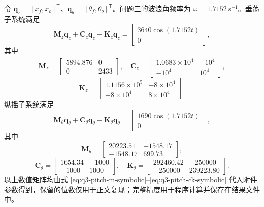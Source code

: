 \documentclass[withoutpreface]{../../../templates/CUMCM2026-Complete-LaTeX/cumcmthesis}
\begin{document}
令 $\boldsymbol q_z=[x_f,x_o]^{\mathsf T}$、$\boldsymbol q_\theta=[\theta_f,\theta_o]^{\mathsf T}$。问题三的波浪角频率为 $\omega=1.7152\ \mathrm{s^{-1}}$。垂荡子系统满足
\begin{equation}
  \boldsymbol M_z\ddot{\boldsymbol q}_z+
  \boldsymbol C_z\dot{\boldsymbol q}_z+
  \boldsymbol K_z\boldsymbol q_z=
  \begin{bmatrix}3640\cos(1.7152t)\\0\end{bmatrix},
  \label{eq:q3-heave-system}
\end{equation}
其中
\begin{equation}
  \boldsymbol M_z=\begin{bmatrix}5894.876&0\\0&2433\end{bmatrix},\quad
  \boldsymbol C_z=\begin{bmatrix}1.0683\times10^4&-10^4\\-10^4&10^4\end{bmatrix},
  \label{eq:q3-heave-mc}
\end{equation}
\begin{equation}
  \boldsymbol K_z=\begin{bmatrix}1.1156\times10^5&-8\times10^4\\-8\times10^4&8\times10^4\end{bmatrix}.
  \label{eq:q3-heave-k}
\end{equation}
纵摇子系统满足
\begin{equation}
  \boldsymbol M_\theta\ddot{\boldsymbol q}_\theta+
  \boldsymbol C_\theta\dot{\boldsymbol q}_\theta+
  \boldsymbol K_\theta\boldsymbol q_\theta=
  \begin{bmatrix}1690\cos(1.7152t)\\0\end{bmatrix},
  \label{eq:q3-pitch-system}
\end{equation}
其中
\begin{equation}
  \boldsymbol M_\theta=
  \begin{bmatrix}20223.51&-1548.17\\-1548.17&699.73\end{bmatrix},
  \label{eq:q3-pitch-m}
\end{equation}
\begin{equation}
  \boldsymbol C_\theta=
  \begin{bmatrix}1654.34&-1000\\-1000&1000\end{bmatrix},\quad
  \boldsymbol K_\theta=
  \begin{bmatrix}292460.42&-250000\\-250000&239223.80\end{bmatrix}.
  \label{eq:q3-pitch-ck}
\end{equation}
以上数值矩阵均由式 \eqref{eq:q3-pitch-m-symbolic}--\eqref{eq:q3-pitch-ck-symbolic} 代入附件参数得到，保留的位数仅用于正文复现；完整精度用于程序计算并保存在结果文件中。
\end{document}
